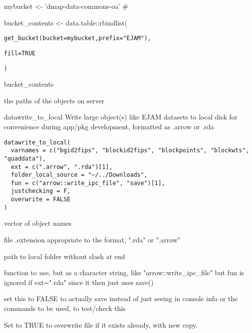 \documentclass[a4paper]{book}
\begin{document}
%
\begin{Details}\relax
mybucket <-  'dmap-data-commons-oa' \#

bucket\_contents <- data.table::rbindlist(

\begin{alltt}get_bucket(bucket = mybucket, prefix = "EJAM"),

fill = TRUE
  
)
\end{alltt}


bucket\_contents
\end{Details}
%
\begin{Value}
the paths of the objects on server
\end{Value}
%
\begin{Description}\relax
datawrite\_to\_local
Write large object(s) like EJAM datasets to local disk for convenience during app/pkg development, formatted as .arrow or .rda
\end{Description}
%
\begin{Usage}
\begin{verbatim}
datawrite_to_local(
  varnames = c("bgid2fips", "blockid2fips", "blockpoints", "blockwts", "quaddata"),
  ext = c(".arrow", ".rda")[1],
  folder_local_source = "~/../Downloads",
  fun = c("arrow::write_ipc_file", "save")[1],
  justchecking = F,
  overwrite = FALSE
)
\end{verbatim}
\end{Usage}
%
\begin{Arguments}
\begin{ldescription}
\item[\code{varnames}] vector of object names

\item[\code{ext}] file .extension appropriate to the format, ".rda" or ".arrow"

\item[\code{folder\_local\_source}] path to local folder without slash at end

\item[\code{fun}] function to use, but as a character string, like "arrow::write\_ipc\_file"
but fun is ignored if ext=".rda" since it then just uses save()

\item[\code{justchecking}] set this to FALSE to actually save instead of
just seeing in console info or the commands to be used, to test/check this

\item[\code{overwrite}] Set to TRUE to overwrite file if it exists already, with new copy.
\end{ldescription}
\end{Arguments}
\end{document}
